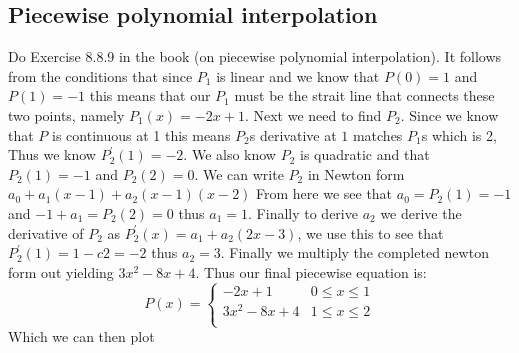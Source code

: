 \documentclass{article}
\begin{document}
\newpage
\subsection{Piecewise polynomial interpolation}
Do Exercise 8.8.9 in the book (on piecewise polynomial interpolation).
\newline\newline
It follows from the conditions that since $P_1$ is linear and we know that $P(0) = 1$ and $P(1) = -1$ this means that our $P_1$ must be the strait line that connects these two points, namely $P_1(x) = -2x + 1$.
\newline\newline
Next we need to find $P_2$. Since we know that $P$ is continuous at 1 this means $P_2$s derivative at $1$ matches $P_1$s which is 2, Thus we know $P^{'}_2(1)=-2$. We also know $P_2$ is quadratic and that $P_2(1)=-1$ and $P_2(2)=0$. We can write $P_2$ in Newton form $a_0+a_1(x-1)+a_2(x-1)(x-2)$ From here we see that $a_0 = P_2(1) = -1$ and $-1 + a_1 = P_2(2) = 0$ thus $a_1 = 1$. Finally to derive $a_2$ we derive the derivative of $P_2$ as $P^{'}_2(x) = a_1+a_2(2x-3)$, we use this to see that $P^{'}_2(1) = 1 - c2 = -2$ thus $a_2=3$. Finally we multiply the completed newton form out yielding $3x^2-8x+4$.
Thus our final piecewise equation is:
\[ P(x)=\begin{cases} 
      -2x + 1 & 0\leq x \leq1 \\
      3x^2-8x+4 & 1\leq x\leq 2 \\
   \end{cases}
\]
Which we can then plot 
\end{document}
